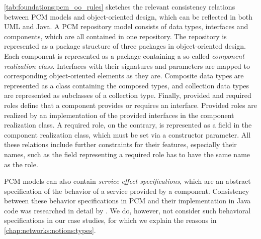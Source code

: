 \autoref{tab:foundations:pcm_oo_rules} sketches the relevant consistency relations between \gls{PCM} models and object-oriented design, which can be reflected in both \gls{UML} and Java.
A \gls{PCM} repository model consists of data types, interfaces and components, which are all contained in one repository.
The repository is represented as a package structure of three packages in object-oriented design.
Each component is represented as a package containing a so called \emph{component realization class}.
Interfaces with their signatures and parameters are mapped to corresponding object-oriented elements as they are.
Composite data types are represented as a class containing the composed types, and collection data types are represented as subclasses of a collection type.
Finally, provided and required roles define that a component provides or requires an interface.
Provided roles are realized by an implementation of the provided interfaces in the component realization class.
A required role, on the contrary, is represented as a field in the component realization class, which must be set via a constructor parameter.
All these relations include further constraints for their features, especially their names, such as the field representing a required role has to have the same name as the role.

\gls{PCM} models can also contain \emph{service effect specifications}, which are an abstract specification of the behavior of a service provided by a component.
Consistency between these behavior specifications in \gls{PCM} and their implementation in Java code was researched in detail by \textcite{langhammer2017a}.
We do, however, not consider such behavioral specifications in our case studies, for which we explain the reasons in \autoref{chap:networks:notions:types}.

